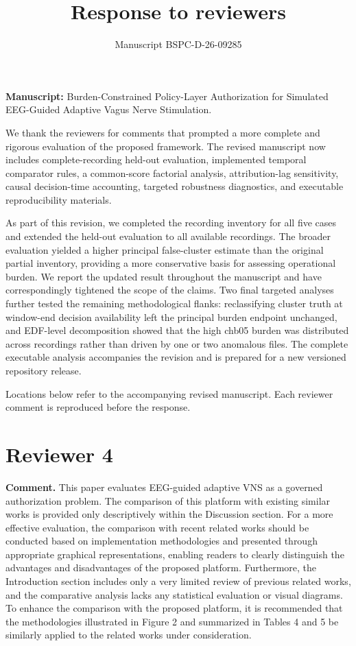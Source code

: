\documentclass[11pt,a4paper]{article}
\title{Response to reviewers}
\author{Manuscript BSPC-D-26-09285}
\date{}
\begin{document}
\maketitle
\textbf{Manuscript:} Burden-Constrained Policy-Layer Authorization for Simulated EEG-Guided Adaptive Vagus Nerve Stimulation.

We thank the reviewers for comments that prompted a more complete and rigorous evaluation of the proposed framework. The revised manuscript now includes complete-recording held-out evaluation, implemented temporal comparator rules, a common-score factorial analysis, attribution-lag sensitivity, causal decision-time accounting, targeted robustness diagnostics, and executable reproducibility materials.

As part of this revision, we completed the recording inventory for all five cases and extended the held-out evaluation to all available recordings. The broader evaluation yielded a higher principal false-cluster estimate than the original partial inventory, providing a more conservative basis for assessing operational burden. We report the updated result throughout the manuscript and have correspondingly tightened the scope of the claims. Two final targeted analyses further tested the remaining methodological flanks: reclassifying cluster truth at window-end decision availability left the principal burden endpoint unchanged, and EDF-level decomposition showed that the high chb05 burden was distributed across recordings rather than driven by one or two anomalous files. The complete executable analysis accompanies the revision and is prepared for a new versioned repository release.

Locations below refer to the accompanying revised manuscript. Each reviewer comment is reproduced before the response.
\section*{Reviewer 4}

\textbf{Comment.} This paper evaluates EEG-guided adaptive VNS as a governed authorization problem. The comparison of this platform with existing similar works is provided only descriptively within the Discussion section. For a more effective evaluation, the comparison with recent related works should be conducted based on implementation methodologies and presented through appropriate graphical representations, enabling readers to clearly distinguish the advantages and disadvantages of the proposed platform. Furthermore, the Introduction section includes only a very limited review of previous related works, and the comparative analysis lacks any statistical evaluation or visual diagrams. To enhance the comparison with the proposed platform, it is recommended that the methodologies illustrated in Figure 2 and summarized in Tables 4 and 5 be similarly applied to the related works under consideration.
\end{document}
